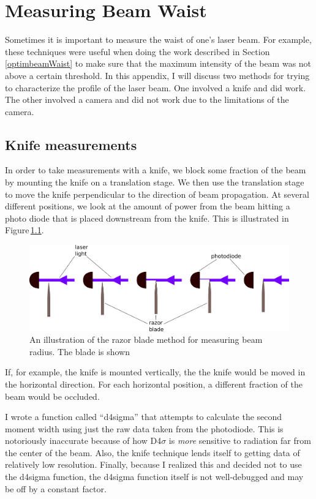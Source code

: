 \chapter{Measuring Beam Waist}
\label{BeamWaistAppendix}

Sometimes it is important to measure the waist of one's laser beam. For example, these techniques were useful when doing the work described in Section\,\ref{optimbeamWaist} to make sure that the maximum intensity of the beam was not above a certain threshold. In this appendix, I will discuss two methods for trying to characterize the profile of the laser beam. One involved a knife and did work. The other involved a camera and did not work due to the limitations of the camera.  

\section{Knife measurements}
In order to take measurements with a knife, we block some fraction of the beam by mounting the knife on a translation stage. We then use the translation stage to move the knife perpendicular to the direction of beam propagation. At several different positions, we look at the amount of power from the beam hitting a photo diode that is placed downstream from the knife. This is illustrated in Figure\,\ref{knifeDiagram}.
\begin{figure}
\includegraphics[width=.95\textwidth]{knife_drawing}
\caption[Knife diagram]{\label{knifeDiagram} An illustration of the razor blade method for measuring beam radius. The blade is shown 
}
\end{figure}
If, for example, the knife is mounted vertically, the the knife would be moved in the horizontal direction. For each horizontal position, a different fraction of the beam would be occluded. 

I wrote a function called ``d4sigma'' that attempts to calculate the second moment width using just the raw data taken from the photodiode. This is notoriously inaccurate because of how D4$\sigma$ is \emph{more} sensitive to radiation far from the center of the beam. Also, the knife technique lends itself to getting data of relatively low resolution. Finally, because I realized this and decided not to use the d4sigma function, the d4sigma function itself is not well-debugged and may be off by a constant factor.

